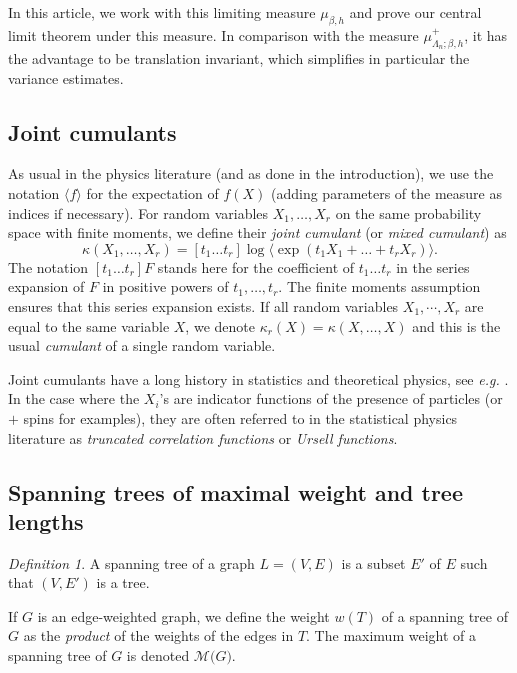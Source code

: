 \documentclass{amsart}
\def\Dep{L}
\def\WDep{G}
\newcommand{\MWST}[1]{\mathcal{M} \big( #1 \big)}
\numberwithin{equation}{section}
\theoremstyle{remark}
\newtheorem{definition}[theorem]{Definition}
\begin{document}
In this article, we work with this limiting measure $\mu_{\beta,h}$
and prove our central limit theorem under this measure.
In comparison with the measure $\mu^{+}_{\Lambda_n;\beta, h}$, it has the advantage to be translation
invariant, which simplifies in particular the variance estimates.


\subsection{Joint cumulants}
\label{sec:cumulants}
As usual in the physics literature (and as done in the introduction), we use the notation $\langle f \rangle$
for the expectation of $f(X)$ (adding parameters of the measure as indices if necessary). 
For random variables $X_1,\dots,X_r$ on the same probability space with finite moments,
we define their {\em joint cumulant} (or {\em mixed cumulant}) as
\begin{equation}
    \kappa (X_1,\dots,X_r) = [t_1 \dots t_r] \log 
\big\langle \exp(t_1 X_1 + \dots + t_r X_r) \big\rangle.
    \label{EqDefCumulant}
\end{equation}
The notation $[t_1 \dots t_r] F$ stands here for the coefficient of $t_1 \dots t_r$ 
in the series expansion of $F$ in positive powers of $t_1, \dots, t_r$.
The finite moments assumption ensures that this series expansion exists.
If all random variables $X_1,\cdots,X_r$ are equal to the same variable $X$,
we denote $\kappa_r(X)=\kappa(X,\dots,X)$ and this is the usual {\em cumulant}
of a single random variable.
\medskip

Joint cumulants have a long history in statistics
and theoretical physics, see {\em e.g.} \cite{UrsellCumulants}.
In the case where the $X_i$'s are indicator functions of the presence of particles (or $+$ spins for examples),
they are often referred to in the statistical physics literature as {\em truncated correlation functions}
or {\em Ursell functions}.



\subsection{Spanning trees of maximal weight and  tree lengths}
\label{Subsect:Spanning}
\begin{definition}
A spanning tree of a graph $\Dep=(V,E)$ is
a subset $E'$ of $E$ such that $(V,E')$ is a tree.
\end{definition}
If $\WDep$ is an edge-weighted graph,
we define the weight $w(T)$ of a spanning tree of $\WDep$
as the {\em product} of the weights of the edges in $T$.
The maximum weight of a spanning tree of $\WDep$
is denoted $\MWST{\WDep}$.
\end{document}
